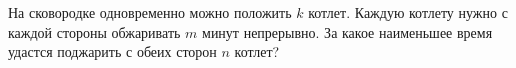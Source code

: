 На сковородке одновременно можно положить $k$ котлет. Каждую котлету нужно с каждой стороны обжаривать $m$ минут непрерывно. За какое наименьшее время удастся поджарить с обеих сторон $n$ котлет?